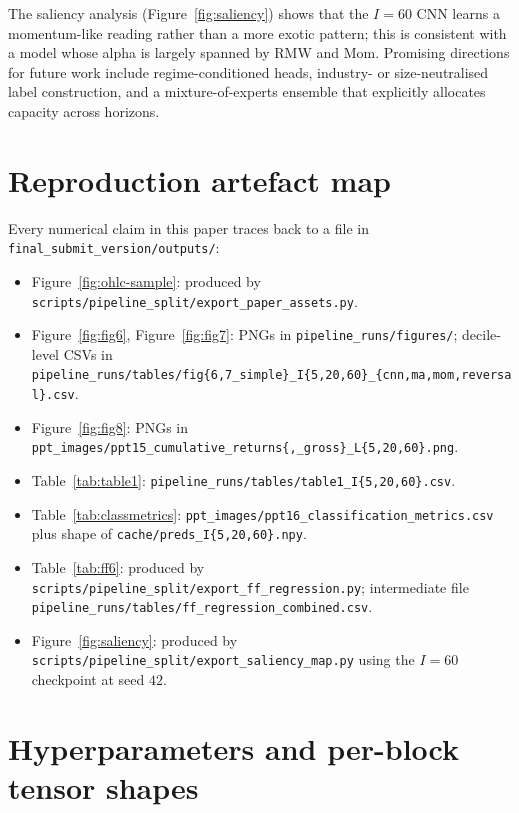 \documentclass{article}
\begin{document}
The saliency analysis (Figure~\ref{fig:saliency}) shows that the
$I=60$ CNN learns a momentum-like reading rather than a more exotic
pattern; this is consistent with a model whose alpha is largely
spanned by RMW and Mom. Promising directions for future work include
regime-conditioned heads, industry- or size-neutralised label
construction, and a mixture-of-experts ensemble that explicitly
allocates capacity across horizons.






\appendix

\section{Reproduction artefact map}
\label{app:artefacts}

Every numerical claim in this paper traces back to a file in
\texttt{final\_submit\_version/outputs/}:
\begin{itemize}
  \item Figure~\ref{fig:ohlc-sample}: produced by
        \texttt{scripts/pipeline\_split/export\_paper\_assets.py}.
  \item Figure~\ref{fig:fig6}, Figure~\ref{fig:fig7}: PNGs in
        \texttt{pipeline\_runs/figures/}; decile-level CSVs in
        \texttt{pipeline\_runs/tables/fig\{6,7\_simple\}\_I\{5,20,60\}\_\{cnn,ma,mom,reversal\}.csv}.
  \item Figure~\ref{fig:fig8}: PNGs in
        \texttt{ppt\_images/ppt15\_cumulative\_returns\{,\_gross\}\_L\{5,20,60\}.png}.
  \item Table~\ref{tab:table1}:
        \texttt{pipeline\_runs/tables/table1\_I\{5,20,60\}.csv}.
  \item Table~\ref{tab:classmetrics}:
        \texttt{ppt\_images/ppt16\_classification\_metrics.csv} plus
        shape of \texttt{cache/preds\_I\{5,20,60\}.npy}.
  \item Table~\ref{tab:ff6}: produced by
        \texttt{scripts/pipeline\_split/export\_ff\_regression.py};
        intermediate file
        \texttt{pipeline\_runs/tables/ff\_regression\_combined.csv}.
  \item Figure~\ref{fig:saliency}: produced by
        \texttt{scripts/pipeline\_split/export\_saliency\_map.py} using
        the $I=60$ checkpoint at seed $42$.
\end{itemize}

\section{Hyperparameters and per-block tensor shapes}
\label{app:hyper}
\end{document}
